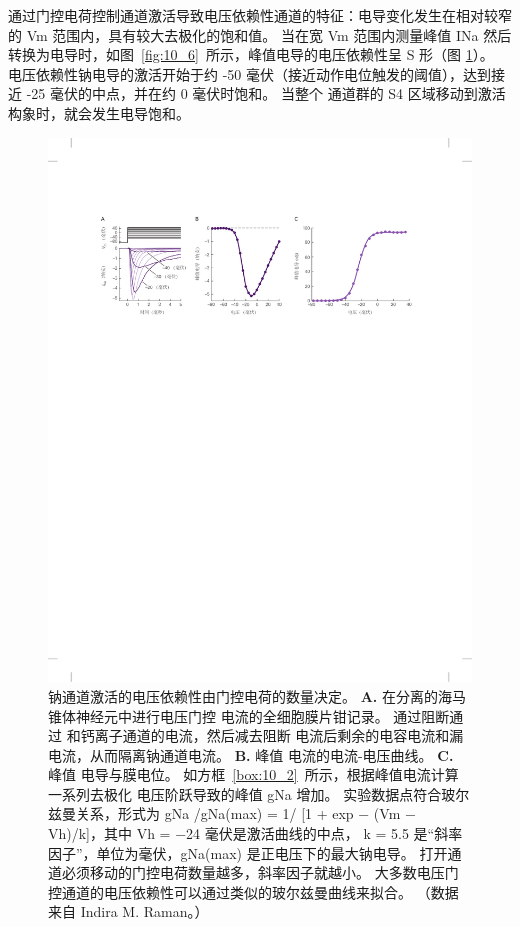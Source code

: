 通过门控电荷控制通道激活导致电压依赖性通道的特征：电导变化发生在相对较窄的 Vm 范围内，具有较大去极化的饱和值。
当在宽 Vm 范围内测量峰值 INa 然后转换为电导时，如图~\ref{fig:10_6}~所示，峰值电导的电压依赖性呈 S 形（图 \ref{fig:10_11}）。
电压依赖性钠电导的激活开始于约 -50 毫伏（接近动作电位触发的阈值），达到接近 -25 毫伏的中点，并在约 0 毫伏时饱和。 
当整个  通道群的 S4 区域移动到激活构象时，就会发生电导饱和。


\begin{figure}[htbp]
	\centering
	\includegraphics[width=0.9\linewidth]{chap10/fig_10_11}
	\caption{钠通道激活的电压依赖性由门控电荷的数量决定。
		\textbf{A.} 在分离的海马锥体神经元中进行电压门控  电流的全细胞膜片钳记录。
		通过阻断通过  和钙离子通道的电流，然后减去阻断  电流后剩余的电容电流和漏电流，从而隔离钠通道电流。
		\textbf{B.} 峰值  电流的电流-电压曲线。
		\textbf{C.} 峰值  电导与膜电位。 如方框~\ref{box:10_2}~所示，根据峰值电流计算一系列去极化
		电压阶跃导致的峰值 gNa 增加。
		实验数据点符合玻尔兹曼关系，形式为 gNa /gNa(max) = 1/ [1 + exp − (Vm − Vh)/k]，其中 Vh = −24 毫伏是激活曲线的中点， k = 5.5 是“斜率因子”，单位为毫伏，gNa(max) 是正电压下的最大钠电导。
		打开通道必须移动的门控电荷数量越多，斜率因子就越小。
		大多数电压门控通道的电压依赖性可以通过类似的玻尔兹曼曲线来拟合。 （数据来自 Indira M. Raman。）}
	\label{fig:10_11}
\end{figure}


